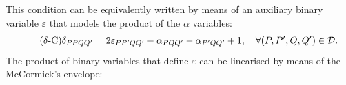 \documentclass[a4paper,  review, authoryear, 1p.]{elsarticle}
\newcommand{\VB}{{V^{}_{\mathcal B}}}
\newcommand{\CV}[1]{{\color{blue}#1}}
\begin{document}
	This condition can be equivalently written by means of an auxiliary binary variable $\varepsilon$ that models the product of the $\alpha$ variables:
	\begin{equation*}\tag{$\delta$-C}\label{eq:deltaC}
		\delta_{PPQQ'}=2\varepsilon_{PP'QQ'} -\alpha_{PQQ'}-\alpha_{P'QQ'}+1,\quad\forall (P,P',Q,Q')\in\mathcal D.
	\end{equation*}
	The product of binary variables that define $\varepsilon$ can be linearised by means of the McCormick's envelope:
\end{document}
